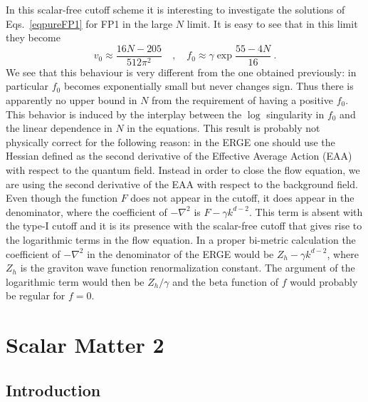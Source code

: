 \documentclass[11pt]{book} %
\newcommand{\be}{\begin{equation}}
\newcommand{\ee}{\end{equation}}
\numberwithin{equation}{chapter}
\begin{document}
In this scalar-free cutoff scheme it is interesting to investigate the solutions of
Eqs.~\eqref{eqpureFP1} for FP1 in the large $N$ limit.
It is easy to see that in this limit they become
\be
v_0\approx \frac{16N-205}{512\pi^2} \quad , \quad
f_0\approx \gamma\exp{\frac{55-4N}{16}}\ .
\ee
We see that this behaviour is very different from the one obtained previously:
in particular $f_0$ becomes exponentially small but never changes sign.
Thus there is apparently no upper bound in $N$ from the requirement of having a positive $f_0$.
This behavior is induced by the interplay between the $\log$ singularity
in $f_0$ and the linear dependence in $N$ in the equations.
This result is probably not physically correct for the following
reason: in the ERGE one should use the Hessian defined as the second
derivative of the Effective Average Action (EAA) with respect to the quantum field.
Instead in order to close the flow equation,
we are using the second derivative of the
EAA with respect to the background field.
Even though the function $F$ does not appear in the cutoff,
it does appear in the denominator, where the coefficient
of $-\nabla^2$ is $F-\gamma k^{d-2}$.
This term is absent with the type-I cutoff and
it is its presence with the scalar-free cutoff that gives rise
to the logarithmic terms in the flow equation.
In a proper bi-metric calculation the coefficient of
$-\nabla^2$ in the denominator of the ERGE
would be $Z_h-\gamma k^{d-2}$, where $Z_h$ is the graviton
wave function renormalization constant.
The argument of the logarithmic term would then be $Z_h/\gamma$
and the beta function of $f$ would probably be regular for $f=0$.




\chapter{Scalar Matter 2}

\section{Introduction}
%
\end{document}
